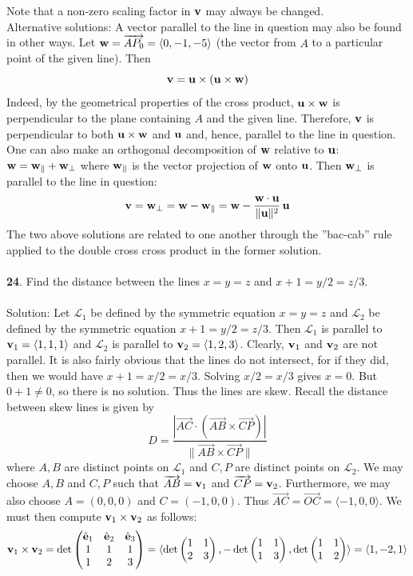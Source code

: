 \documentclass[12pt]{amsbook}
\newcommand{\la}{\langle}
\newcommand{\ra}{\rangle}
\begin{document}
Note that a non-zero scaling factor in ${\bf v}$ may always be changed. \\
{\sc Alternative solutions}: A vector parallel to the line in question
 may also be 
found in other ways. Let ${\bf w}=\overrightarrow{AP_0}=\langle 0,-1,-5\rangle$
(the vector from $A$ to a particular point of the given line). Then 
$$
{\bf v}={\bf u}\times({\bf u}\times{\bf w})
$$
Indeed, by the geometrical properties of the cross product,  
${\bf u}\times{\bf w}$ is perpendicular to the plane containing 
$A$ and the given line. Therefore, ${\bf v}$  is perpendicular to both
${\bf u}\times{\bf w}$ and ${\bf u}$ and, hence, parallel to the line 
in question.  One can also make an orthogonal decomposition of ${\bf w}$
relative to ${\bf u}$: ${\bf w}={\bf w}_\|+{\bf w}_\bot$ where 
${\bf w}_\|$ is the vector projection of ${\bf w}$ onto ${\bf u}$. Then 
${\bf w}_\bot$ is parallel to the line in question:
$$
{\bf v}={\bf w}_\bot={\bf w}-{\bf w}_\|={\bf w}-\frac{{\bf w}\cdot {\bf u}}
{\|{\bf u}\|^2}\, {\bf u}
$$
The two above solutions are related to one another through the ''bac-cab'' rule 
applied to the double cross cross product in the former solution.\\
\\
{\small\bf 24}. Find the distance between the lines
$x=y=z$ and $x+1=y/2=z/3$.\\
\\
{\sc Solution}: Let $\mathcal{L}_1$ be defined by the symmetric equation $x=y=z$ and $\mathcal{L}_2$ be defined by the symmetric equation $x+1=y/2=z/3$. Then $\mathcal{L}_1$ is parallel to ${\bf v}_1=\la 1,1,1 \ra$ and $\mathcal{L}_2$ is parallel to ${\bf v}_2=\la 1,2,3 \ra$. Clearly, ${\bf v}_1$ and ${\bf v}_2$ are not parallel. It is also fairly obvious that the lines do not intersect, for if they did, then we would have $x+1=x/2=x/3$. Solving $x/2=x/3$ gives $x=0$. But $0+1 \neq 0$, so there is no solution. Thus the lines are skew. Recall the distance between skew lines is given by
$$D=\frac{|\overrightarrow{AC}\cdot(\overrightarrow{AB}\times\overrightarrow{CP})|}{\|\overrightarrow{AB}\times\overrightarrow{CP}\|}$$
where $A,B$ are distinct points on $\mathcal{L}_1$ and $C,P$ are distinct points on $\mathcal{L}_2$. We may choose $A,B$ and $C,P$ such that $\overrightarrow{AB}={\bf v}_1$ and $\overrightarrow{CP}={\bf v}_2$. Furthermore, we may also choose $A=(0,0,0)$ and $C=(-1,0,0)$. Thus $\overrightarrow{AC}=\overrightarrow{OC}=\la -1,0,0 \ra$. We must then compute ${\bf v}_1\times{\bf v}_2$ as follows:
$${\bf v}_1\times{\bf v}_2=\det
\begin{pmatrix}
\hat{\bf e}_1 & \hat{\bf e}_2 & \hat{\bf e}_3\cr 1&1&1\cr 1&2&3 \end{pmatrix}=\la \det\begin{pmatrix}1&1\cr 2&3  \end{pmatrix}, -\det\begin{pmatrix}1&1\cr 1&3  \end{pmatrix}, \det\begin{pmatrix}1&1\cr 1&2 \end{pmatrix} \ra = \la 1,-2,1 \ra$$
\end{document}
